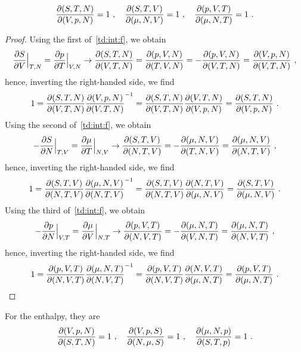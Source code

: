     \begin{equation*}
        \frac{\partial(S, T, N)}{\partial(V, p, N)} = 1 ~, \quad \frac{\partial(S, T, V)}{\partial(\mu, N, V)} = 1 ~, \quad \frac{\partial(p, V, T)}{\partial(\mu, N, T)} = 1 ~.
    \end{equation*}
    \begin{proof}
        Using the first of~\eqref{td:int:f}, we obtain
        \begin{equation*}
            \frac{\partial S}{\partial V} \Big \vert_{T, N} = \frac{\partial p}{\partial T} \Big \vert_{V, N} \rightarrow \frac{\partial(S, T, N)}{\partial(V, T, N)} = \frac{\partial(p, V, N)}{\partial(T, V, N)} = - \frac{\partial(p, V, N)}{\partial(V, T, N)} = \frac{\partial(V, p, N)}{\partial(V, T, N)} ~,
        \end{equation*} 
        hence, inverting the right-handed side, we find
        \begin{equation*}
            1 = \frac{\partial(S, T, N)}{\partial(V, T, N)} \frac{\partial(V, p, N)}{\partial(V, T, N)}^{-1} = \frac{\partial(S, T, N)}{\partial(V, T, N)} \frac{\partial(V, T, N)}{\partial(V, p, N)} = \frac{\partial(S, T, N)}{\partial(V, p, N)} ~.
        \end{equation*} 
        Using the second of~\eqref{td:int:f}, we obtain
        \begin{equation*}
            - \frac{\partial S}{\partial N} \Big \vert_{T, V} = \frac{\partial\mu}{\partial T} \Big \vert_{N, V} \rightarrow \frac{\partial(S, T, V)}{\partial(N, T, V)} = - \frac{\partial(\mu, N, V)}{\partial(T, N, V)} = \frac{\partial(\mu, N, V)}{\partial(N, T, V)} ~,
        \end{equation*} 
        hence, inverting the right-handed side, we find
        \begin{equation*}
            1 = \frac{\partial(S, T, V)}{\partial(N, T, V)}  \frac{\partial(\mu, N, V)}{\partial(N, T, V)}^{-1} = \frac{\partial(S, T, V)}{\partial(N, T, V)} \frac{\partial(N, T, V)}{\partial(\mu, N, V)} = \frac{\partial(S, T, V)}{\partial(\mu, N, V)} ~.
        \end{equation*} 
        Using the third of~\eqref{td:int:f}, we obtain
        \begin{equation*}
            - \frac{\partial p}{\partial N} \Big \vert_{V, T} = \frac{\partial\mu}{\partial V} \Big \vert_{N, T} \rightarrow \frac{\partial(p, V, T)}{\partial(N, V, T)} = - \frac{\partial(\mu, N, T)}{\partial(V, N ,T)} = \frac{\partial(\mu, N, T)}{\partial(N, V ,T)} ~,
        \end{equation*} 
        hence, inverting the right-handed side, we find
        \begin{equation*}
            1 = \frac{\partial(p, V, T)}{\partial(N, V, T)} \frac{\partial(\mu, N, T)}{\partial(N, V ,T)}^{-1} = \frac{\partial(p, V, T)}{\partial(N, V, T)} \frac{\partial(N, V ,T)}{\partial(\mu, N, T)} = \frac{\partial(p, V, T)}{\partial(\mu, N, T)} ~.
        \end{equation*} 
    \end{proof}
    For the enthalpy, they are 
    \begin{equation*}
        \frac{\partial(V, p, N)}{\partial(S, T, N)} = 1 ~, \quad \frac{\partial(V, p, S)}{\partial(N, \mu, S)} = 1 ~, \quad \frac{\partial(\mu, N, p)}{\partial(S, T, p)} = 1 ~.
    \end{equation*}
